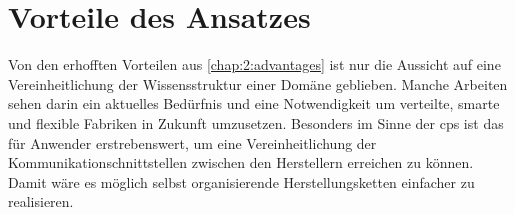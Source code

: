 \section{Vorteile des Ansatzes}
Von den erhofften Vorteilen aus \autoref{chap:2:advantages} ist nur die Aussicht auf eine Vereinheitlichung der Wissensstruktur einer Domäne geblieben. Manche Arbeiten sehen darin ein aktuelles Bedürfnis und eine Notwendigkeit um verteilte, smarte und flexible Fabriken in Zukunft umzusetzen. Besonders im Sinne der \Gls{cps} ist das für Anwender erstrebenswert, um eine Vereinheitlichung der Kommunikationschnittstellen zwischen den Herstellern erreichen zu können. Damit wäre es möglich selbst organisierende Herstellungsketten einfacher zu realisieren. \cite{lasi2014industry, kolberg2015lean}